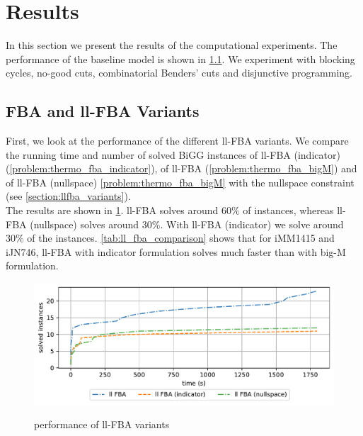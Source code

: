 \clearpage
\section{Results}

In this section we present the results of the computational experiments. The performance of the baseline model is shown in \cref{section:methods_ll_fba_variants}. We experiment with blocking cycles, no-good cuts, combinatorial Benders' cuts and disjunctive programming.

\subsection{FBA and ll-FBA Variants} \label{section:methods_ll_fba_variants}
First, we look at the performance of the different ll-FBA variants. We compare the running time and number of solved BiGG instances of ll-FBA (indicator) (\cref{problem:thermo_fba_indicator}), of ll-FBA (\cref{problem:thermo_fba_bigM}) and of ll-FBA (nullspace) \cref{problem:thermo_fba_bigM} with the nullspace constraint (see \cref{section:llfba_variants}).\\
The results are shown in \cref{fig:ll_fba_comparion}.
ll-FBA solves around $60\%$ of instances, whereas ll-FBA (nullspace) solves around $30\%$. With ll-FBA (indicator) we solve around $30\%$ of the instances. \cref{tab:ll_fba_comparison} shows that for \textsf{iMM1415} and \textsf{iJN746}, ll-FBA with indicator formulation solves much faster than with big-M formulation. 

\begin{figure}[h!]
    \caption{performance of ll-FBA variants}
    \centering
    \includegraphics[width=1.0\textwidth]{Images/fba_variants_comparison_plot.pdf}
    \label{fig:ll_fba_comparion}
\end{figure}

